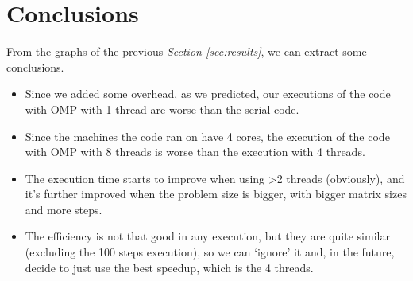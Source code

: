 \documentclass[../main.tex]{subfiles}
\begin{document}
\section{Conclusions}

From the graphs of the previous \textit{Section \ref{sec:results}}, we can extract some conclusions.

\begin{itemize}
    \item Since we added some overhead, as we predicted, our executions of the code with OMP with 1 thread are worse than the serial code.
    \item Since the machines the code ran on have 4 cores, the execution of the code with OMP with 8 threads is worse than the execution with 4 threads.
    \item The execution time starts to improve when using >2 threads (obviously), and it's further improved when the problem size is bigger, with bigger matrix sizes and more steps.
    \item The efficiency is not that good in any execution, but they are quite similar (excluding the 100 steps execution), so we can `ignore' it and, in the future, decide to just use the best speedup, which is the 4 threads.
\end{itemize}
\end{document}
